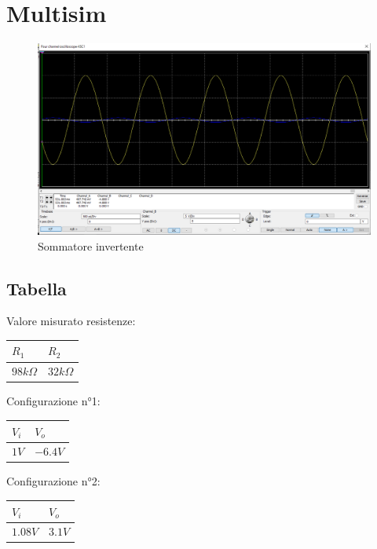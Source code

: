 \documentclass[12pt]{article}
\begin{document}
\section{Multisim}
\begin{figure}[h]
    \centering
    \includegraphics[scale=0.2]{Screenshot (3).png}
    \caption{Sommatore invertente}
\end{figure}
\subsection{Tabella}
Valore misurato resistenze:\\
\begin{center}
        \begin{tabular}{|p{2cm}|p{2cm}|}
            \hline
            \rowcolor{RoyalBlue} $R_1$ & $R_2$ \\
            \hline
            \rowcolor{CornflowerBlue} $98k\Omega$ & $32k\Omega$  \\ 
            \hline
        \end{tabular}
        \label{Valore resistenze}
\end{center}
\noindent
Configurazione n°1:\\
\begin{center}
    \begin{tabular}{|p{2cm} |p{2cm}|}
        \hline
        \rowcolor{RoyalBlue} $V_i$ & $V_o$  \\
        \hline
        \rowcolor{CornflowerBlue} $1V$ & $-6.4V$  \\ 
        \hline
    \end{tabular}
\end{center}


\noindent Configurazione n°2:\\
\begin{center}
    \begin{tabular}{|p{2cm} |p{2cm}|}
        \hline
        \rowcolor{RoyalBlue} $V_i$ & $V_o$  \\
        \hline
        \rowcolor{CornflowerBlue} $1.08V$ & $3.1V$  \\ 
        \hline
    \end{tabular}
\end{center}
\end{document}
